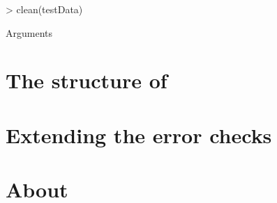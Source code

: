 \documentclass[article]{jss}
\begin{document}
\begin{Schunk}
\begin{Sinput}
> clean(testData)
\end{Sinput}
\end{Schunk}




Arguments

\section{The structure of } \label{sec:internals}


\section{Extending the error checks} \label{sec:extending}

\section[About Java]{About }
\end{document}
